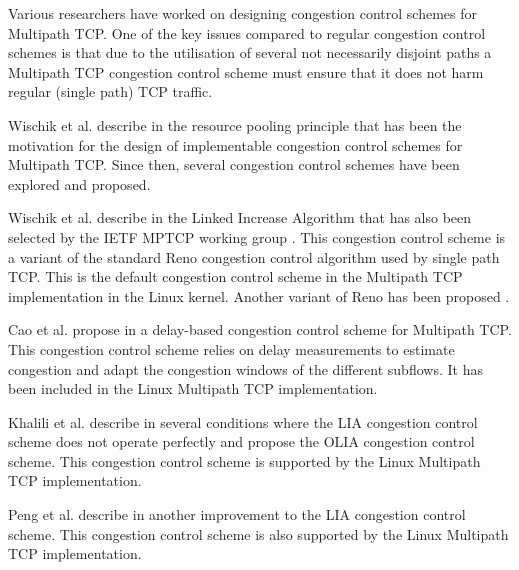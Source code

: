Various researchers have worked on designing congestion control schemes for Multipath TCP. One of the key issues compared to regular congestion control schemes is that due to the utilisation of several not necessarily disjoint paths a Multipath TCP congestion control scheme must ensure that it does not harm regular (single path) TCP traffic.

Wischik et al. describe in \cite{Wischik_Resource:2008} the resource pooling principle that has been the motivation for the design of implementable congestion control schemes for Multipath TCP. Since then, several congestion control schemes have been explored and proposed.

Wischik et al. describe in \cite{Wischik_Design:2011} the Linked Increase Algorithm that has also been selected by the IETF MPTCP working group \cite{rfc6356}. This congestion control scheme is a variant of the standard Reno congestion control algorithm used by single path TCP. This is the default congestion control scheme in the Multipath TCP implementation in the Linux kernel. Another variant of Reno has been proposed \cite{Vo_mReno:2014}.  %


Cao et al. propose in
\cite{Cao_Delay:2012} %
a delay-based congestion control scheme for Multipath TCP. This congestion control scheme relies on delay measurements to estimate congestion and adapt the congestion windows of the different subflows. It has been included in the Linux Multipath TCP implementation.

Khalili et al. describe in \cite{Khalili_MPTCP:2012,Khalili_MPTCP:2013} several conditions where the LIA congestion control scheme does not operate perfectly and propose the OLIA congestion control scheme. This congestion control scheme is supported by the Linux Multipath TCP implementation.  %

Peng et al. describe in \cite{Peng_BALIA:2015} another improvement to the LIA congestion control scheme. This congestion control scheme is also supported by the Linux Multipath TCP implementation.

